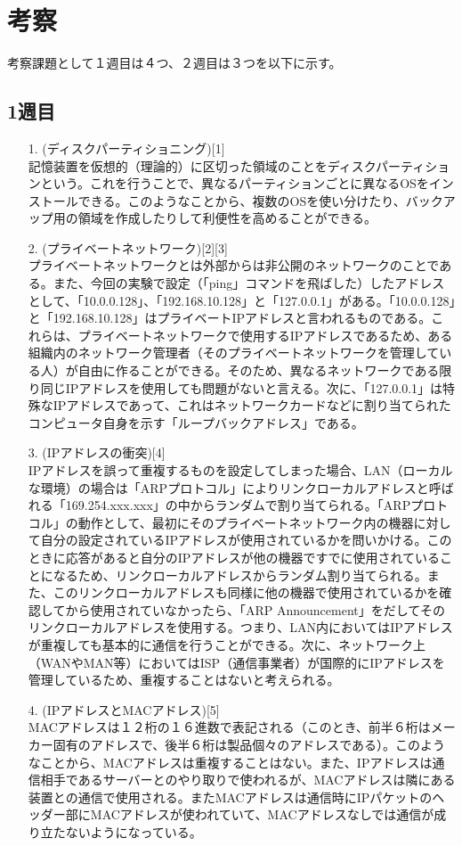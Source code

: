 \documentclass[12pt,a4paper]{jsarticle}
\numberwithin{equation}{section}
\numberwithin{figure}{section}
\numberwithin{table}{section}
\begin{document}
\section{考察}
考察課題として１週目は４つ、２週目は３つを以下に示す。
  \subsection{1週目}
  \begin{itemize}
    \item [1.](ディスクパーティショニング)[1]\\
    記憶装置を仮想的（理論的）に区切った領域のことをディスクパーティションという。これを行うことで、異なるパーティションごとに異なるOSをインストールできる。このようなことから、複数のOSを使い分けたり、バックアップ用の領域を作成したりして利便性を高めることができる。
    \item [2.](プライベートネットワーク)[2][3]\\
    プライベートネットワークとは外部からは非公開のネットワークのことである。また、今回の実験で設定（「ping」コマンドを飛ばした）したアドレスとして、「10.0.0.128」、「192.168.10.128」と「127.0.0.1」がある。「10.0.0.128」と「192.168.10.128」はプライベートIPアドレスと言われるものである。これらは、プライベートネットワークで使用するIPアドレスであるため、ある組織内のネットワーク管理者（そのプライベートネットワークを管理している人）が自由に作ることができる。そのため、異なるネットワークである限り同じIPアドレスを使用しても問題がないと言える。次に、「127.0.0.1」は特殊なIPアドレスであって、これはネットワークカードなどに割り当てられたコンピュータ自身を示す「ループバックアドレス」である。
    \item [3.](IPアドレスの衝突)[4]\\
    IPアドレスを誤って重複するものを設定してしまった場合、LAN（ローカルな環境）の場合は「ARPプロトコル」によりリンクローカルアドレスと呼ばれる「169.254.xxx.xxx」の中からランダムで割り当てられる。「ARPプロトコル」の動作として、最初にそのプライベートネットワーク内の機器に対して自分の設定されているIPアドレスが使用されているかを問いかける。このときに応答があると自分のIPアドレスが他の機器ですでに使用されていることになるため、リンクローカルアドレスからランダム割り当てられる。また、このリンクローカルアドレスも同様に他の機器で使用されているかを確認してから使用されていなかったら、「ARP Announcement」をだしてそのリンクローカルアドレスを使用する。つまり、LAN内においてはIPアドレスが重複しても基本的に通信を行うことができる。次に、ネットワーク上（WANやMAN等）においてはISP（通信事業者）が国際的にIPアドレスを管理しているため、重複することはないと考えられる。
    \item [4.](IPアドレスとMACアドレス)[5]\\MACアドレスは１２桁の１６進数で表記される（このとき、前半６桁はメーカー固有のアドレスで、後半６桁は製品個々のアドレスである）。このようなことから、MACアドレスは重複することはない。また、IPアドレスは通信相手であるサーバーとのやり取りで使われるが、MACアドレスは隣にある装置との通信で使用される。またMACアドレスは通信時にIPパケットのヘッダー部にMACアドレスが使われていて、MACアドレスなしでは通信が成り立たないようになっている。
  \end{itemize}
\end{document}
